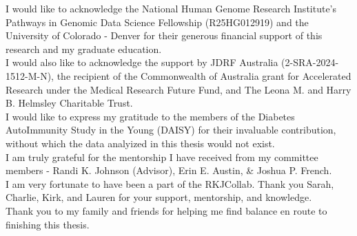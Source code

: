 \documentclass{article}\usepackage[]{graphicx}\usepackage[]{color}
\begin{document}
\noindent
I would like to acknowledge the National Human Genome Research Institute's Pathways in Genomic Data Science Fellowship (R25HG012919) and the University of Colorado - Denver for their generous financial support of this research and my graduate education.\\

\noindent
I would also like to acknowledge the support by JDRF Australia (2-SRA-2024-1512-M-N), the recipient of the Commonwealth of Australia grant for Accelerated Research under the Medical Research Future Fund, and The Leona M. and Harry B. Helmsley Charitable Trust.\\

\noindent
I would like to express my gratitude to the members of the Diabetes AutoImmunity Study in the Young (DAISY) for their invaluable contribution, without which the data analyized in this thesis would not exist.\\

\noindent
I am truly grateful for the mentorship I have received from my committee members - Randi K. Johnson (Advisor), Erin E. Austin, \& Joshua P. French.\\

\noindent
I am very fortunate to have been a part of the RKJCollab. Thank you Sarah, Charlie, Kirk, and Lauren for your support, mentorship, and knowledge.\\

\noindent
Thank you to my family and friends for helping me find balance en route to finishing this thesis.\\


\newpage
\end{document}
